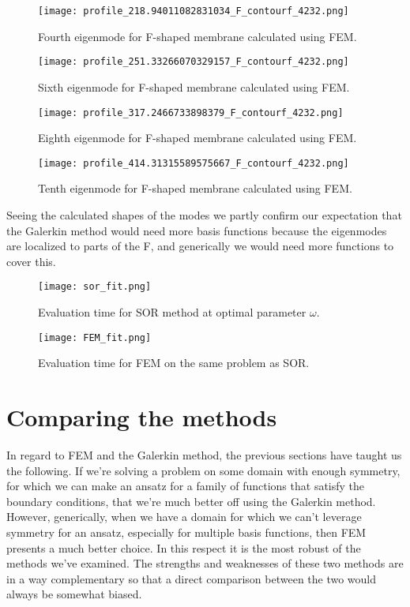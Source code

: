 \documentclass[10pt,a4paper,twocolumn]{article}
\begin{document}
\clearpage

\begin{figure}[!t]
    \centering
    \texttt{[image: profile\_218.94011082831034\_F\_contourf\_4232.png]}
    \caption{Fourth eigenmode for F-shaped membrane calculated using FEM.}
    \label{fig:profileF_2_fem}
\end{figure}

\begin{figure}[!h]
    \centering
    \texttt{[image: profile\_251.33266070329157\_F\_contourf\_4232.png]}
    \caption{Sixth eigenmode for F-shaped membrane calculated using FEM.}
    \label{fig:profileF_3_fem}
\end{figure}

\begin{figure}[!t]
    \centering
    \texttt{[image: profile\_317.2466733898379\_F\_contourf\_4232.png]}
    \caption{Eighth eigenmode for F-shaped membrane calculated using FEM.}
    \label{fig:profileF_4_fem}
\end{figure}

\begin{figure}[!h]
    \centering
    \texttt{[image: profile\_414.31315589575667\_F\_contourf\_4232.png]}
    \caption{Tenth eigenmode for F-shaped membrane calculated using FEM.}
    \label{fig:profileF_5_fem}
\end{figure}

Seeing the calculated shapes of the modes we partly confirm our expectation that the Galerkin method would need more basis functions because the eigenmodes are localized to parts of the F, and generically we would need more functions to cover this.
\clearpage
\begin{figure}[!t]
    \centering
    \texttt{[image: sor\_fit.png]}
    \caption{Evaluation time for SOR method at optimal parameter $\omega$.}
    \label{fig:sor_fit}
\end{figure}

\begin{figure}[!b]
    \centering
    \texttt{[image: FEM\_fit.png]}
    \caption{Evaluation time for FEM on the same problem as SOR.}
    \label{fig:FEM_fit}
\end{figure}

\section{Comparing the methods}

In regard to FEM and the Galerkin method, the previous sections have taught us the following. If we're solving a problem on some domain with enough symmetry, for which we can make an ansatz for a family of functions that satisfy the boundary conditions, that we're much better off using the Galerkin method. However, generically, when we have a domain for which we can't leverage symmetry for an ansatz, especially for multiple basis functions, then FEM presents a much better choice. In this respect it is the most robust of the methods we've examined. The strengths and weaknesses of these two methods are in a way complementary so that a direct comparison between the two would always be somewhat biased.
\end{document}
